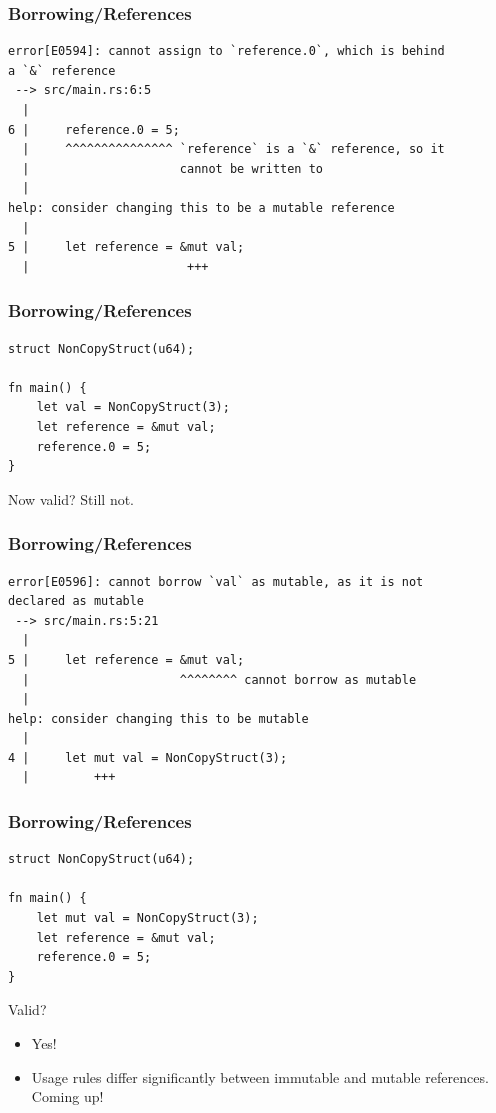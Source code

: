 \begin{frame}[fragile]
    \frametitle{Borrowing/References}
    \begin{verbatim}
error[E0594]: cannot assign to `reference.0`, which is behind
a `&` reference
 --> src/main.rs:6:5
  |
6 |     reference.0 = 5;
  |     ^^^^^^^^^^^^^^^ `reference` is a `&` reference, so it
  |                     cannot be written to
  |
help: consider changing this to be a mutable reference
  |
5 |     let reference = &mut val;
  |                      +++
    \end{verbatim}
\end{frame}

\begin{frame}[fragile]
    \frametitle{Borrowing/References}
    \begin{verbatim}
struct NonCopyStruct(u64);

fn main() {
    let val = NonCopyStruct(3);
    let reference = &mut val;
    reference.0 = 5;
}
    \end{verbatim}
    \pause
    \vfill
    Now valid?
    \pause
    \vfill
    Still not.
\end{frame}

\begin{frame}[fragile]
    \frametitle{Borrowing/References}
    \begin{verbatim}
error[E0596]: cannot borrow `val` as mutable, as it is not
declared as mutable
 --> src/main.rs:5:21
  |
5 |     let reference = &mut val;
  |                     ^^^^^^^^ cannot borrow as mutable
  |
help: consider changing this to be mutable
  |
4 |     let mut val = NonCopyStruct(3);
  |         +++
    \end{verbatim}
\end{frame}

\begin{frame}[fragile]
    \frametitle{Borrowing/References}
    \begin{verbatim}
struct NonCopyStruct(u64);

fn main() {
    let mut val = NonCopyStruct(3);
    let reference = &mut val;
    reference.0 = 5;
}
    \end{verbatim}
    \pause
    \vfill
    Valid?
    \pause
    \vfill
    \begin{itemize}
        \item Yes!
        \pause
        \item Usage rules differ significantly between immutable and mutable references. Coming up!
    \end{itemize}
\end{frame}

